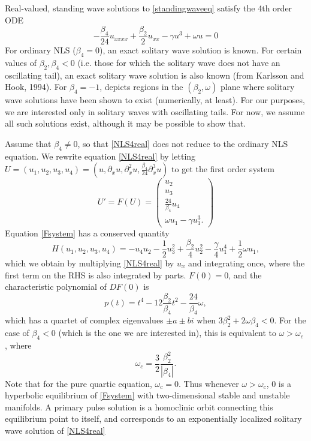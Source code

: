 \documentclass[12pt]{article}
\begin{document}
Real-valued, standing wave solutions to \cref{standingwaveeq} satisfy the 4th order ODE
\begin{equation}\label{NLS4real}
-\frac{\beta_4}{24} u_{xxxx} + \frac{\beta_2}{2} u_{xx} - \gamma u^3 + \omega u = 0
\end{equation}
For ordinary NLS ($\beta_4 = 0$), an exact solitary wave solution is known. For certain values of $\beta_2, \beta_4 < 0$ (i.e. those for which the solitary wave does not have an oscillating tail), an exact solitary wave solution is also known \cite[(5)]{Tam2020} (from Karlsson and Hook, 1994). For $\beta_4 = -1$, \cite[Figure 4(a)]{Tam2020} depicts regions in the $(\beta_2, \omega)$ plane where solitary wave solutions have been shown to exist (numerically, at least). For our purposes, we are interested only in solitary waves with oscillating tails. For now, we assume all such solutions exist, although it may be possible to show that.

Assume that $\beta_4 \neq 0$, so that \cref{NLS4real} does not reduce to the ordinary NLS equation. We rewrite equation \cref{NLS4real} by letting $U = (u_1, u_2, u_3, u_4) = (u, \partial_x u, \partial_x^2 u, \frac{\beta_4}{24} \partial_x^3 u)$ to get the first order system
\begin{equation}\label{Fsystem}
U' = F(U) = \begin{pmatrix}
u_2 \\ u_3 \\ \frac{24}{\beta_4} u_4 \\ \omega u_1 - \gamma u_1^3.
\end{pmatrix}
\end{equation}
Equation \cref{Fsystem} has a conserved quantity
\begin{equation}\label{FsystemH}
H(u_1, u_2, u_3, u_4) = -u_4 u_2 - \frac{1}{2} u_3^2 + \frac{\beta_2}{4}u_2^2 - \frac{\gamma}{4} u_1^4 + \frac{1}{2}\omega u_1,
\end{equation}
which we obtain by multiplying \cref{NLS4real} by $u_x$ and integrating once, where the first term on the RHS is also integrated by parts. $F(0) = 0$, and the characteristic polynomial of $DF(0)$ is
\[
p(t) = t^4 - 12\frac{\beta_2}{\beta_4} t^2 - \frac{24}{\beta_4}\omega,
\]
which has a quartet of complex eigenvalues $\pm a \pm b i$ when $3 \beta_2^2 + 2 \omega \beta_4 < 0$. For the case of $\beta_4 < 0$ (which is the one we are interested in), this is equivalent to $\omega > \omega_c$ \cite[(11)]{Tam2020}, where
\begin{equation}\label{omegac}
\omega_c = \frac{3}{2} \frac{\beta_2^2}{|\beta_4|}.
\end{equation}
Note that for the pure quartic equation, $\omega_c = 0$. Thus whenever $\omega > \omega_c$, 0 is a hyperbolic equilibrium of \cref{Fsystem} with two-dimensional stable and unstable manifolds. A primary pulse solution is a homoclinic orbit connecting this equilibrium point to itself, and corresponds to an exponentially localized solitary wave solution of \cref{NLS4real}
\end{document}
